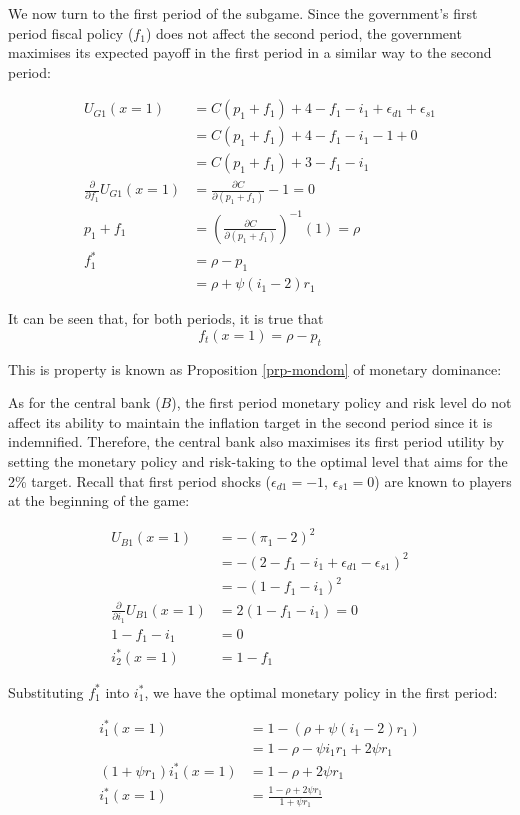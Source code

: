 \documentclass[
  a4paper,
  abstract=true]{scrartcl}
\theoremstyle{definition}
\begin{document}
We now turn to the first period of the subgame. Since the government's
first period fiscal policy (\(f_1\)) does not affect the second period,
the government maximises its expected payoff in the first period in a
similar way to the second period:

\begin{align*}
U_{G1}(x=1)&= C(p_1+f_1) + 4 -f_1-i_1 +\epsilon_{d1}+\epsilon_{s1} \\
&= C(p_1+f_1) + 4 -f_1-i_1 -1+0 \\
&= C(p_1+f_1) + 3 -f_1-i_1 \\
\frac{\partial}{\partial f_1} U_{G1}(x=1) &= \frac{\partial C}{\partial (p_1 + f_1)} -1=0 \\
p_1+f_1 &= \left( \frac{\partial C}{\partial (p_1 + f_1)} \right)^{-1}(1)=\rho \\
f_1^*&= \rho -p_1 \\
&=\rho +\psi(i_1-2)r_1
\end{align*}

It can be seen that, for both periods, it is true that \[
f_t(x=1)=\rho-p_t
\]

This is property is known as Proposition \ref{prp-mondom} of monetary
dominance:

\mondom*

As for the central bank (\(B\)), the first period monetary policy and
risk level do not affect its ability to maintain the inflation target in
the second period since it is indemnified. Therefore, the central bank
also maximises its first period utility by setting the monetary policy
and risk-taking to the optimal level that aims for the 2\% target.
Recall that first period shocks (\(\epsilon_{d1}=-1\),
\(\epsilon_{s1}=0\)) are known to players at the beginning of the game:

\begin{align*}
U_{B1}(x=1) &=-(\pi_1-2)^2 \\
&=-(2-f_1-i_1+\epsilon_{d1}-\epsilon_{s1})^2 \\
&=-(1-f_1-i_1)^2 \\
\frac{\partial}{\partial i_1} U_{B1}(x=1) &= 2(1-f_1-i_1)=0 \\
1-f_1-i_1&=0 \\
i_2^*(x=1) &= 1-f_1
\end{align*}

Substituting \(f_1^*\) into \(i_1^*\), we have the optimal monetary
policy in the first period:

\begin{align*}
i_1^*(x=1) &= 1-(\rho +\psi(i_1-2)r_1) \\
&=1-\rho-\psi i_1r_1+2\psi r_1 \\
(1+\psi r_1)i_1^*(x=1)&=1-\rho+2\psi r_1 \\
i_1^*(x=1)&=\frac{1-\rho+2\psi r_1}{1+\psi r_1}
\end{align*}
\end{document}
